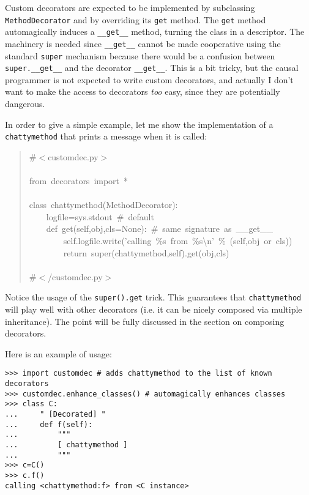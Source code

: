 \documentclass[11pt,english]{article}
\begin{document}
Custom decorators are expected to be implemented by subclassing
\texttt{MethodDecorator} and by overriding its \texttt{get} method. The
\texttt{get} method automagically induces a \texttt{{\_}{\_}get{\_}{\_}} method, turning the 
class in a descriptor. The machinery is needed since \texttt{{\_}{\_}get{\_}{\_}} cannot 
be made cooperative using  the standard \texttt{super} mechanism because
there would be a confusion between \texttt{super.{\_}{\_}get{\_}{\_}} and the decorator 
\texttt{{\_}{\_}get{\_}{\_}}. This is a bit tricky, but the causal programmer is not 
expected to write custom decorators, and actually I don't want to make 
the access to decorators \emph{too} easy, since they are potentially dangerous.

In order to give a simple example, let me show the implementation 
of a \texttt{chattymethod} that prints a message when it is called:
\begin{quote}
\begin{ttfamily}\begin{flushleft}
\mbox{{\#}{$<$}customdec.py{$>$}}\\
\mbox{}\\
\mbox{from~decorators~import~*~~}\\
\mbox{}\\
\mbox{class~chattymethod(MethodDecorator):}\\
\mbox{~~~~logfile=sys.stdout~{\#}~default}\\
\mbox{~~~~def~get(self,obj,cls=None):~{\#}~same~signature~as~{\_}{\_}get{\_}{\_}}\\
\mbox{~~~~~~~~self.logfile.write('calling~{\%}s~from~{\%}s{\textbackslash}n'~{\%}~(self,obj~or~cls))}\\
\mbox{~~~~~~~~return~super(chattymethod,self).get(obj,cls)}\\
\mbox{}\\
\mbox{{\#}{$<$}/customdec.py{$>$}}
\end{flushleft}\end{ttfamily}
\end{quote}

Notice the usage of the \texttt{super().get} trick. This guarantees that 
\texttt{chattymethod} will play well with other decorators (i.e. it
can be nicely composed via multiple inheritance). The point will
be fully discussed in the section on composing decorators.

Here is an example of usage:
\begin{verbatim}>>> import customdec # adds chattymethod to the list of known decorators
>>> customdec.enhance_classes() # automagically enhances classes
>>> class C: 
...     " [Decorated] "
...     def f(self): 
...         """
...         [ chattymethod ]
...         """
>>> c=C()
>>> c.f()
calling <chattymethod:f> from <C instance>\end{verbatim}
\end{document}
